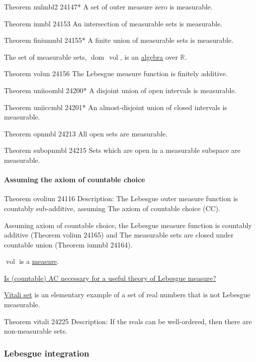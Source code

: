 \documentclass[12pt, letterpaper]{article}
\newcommand{\re}{\mathbb{R}}
\newcommand{\vol}{\operatorname{vol}}
\newcommand{\dom}{{\operatorname{dom}\,}}
\theoremstyle{definition}
\theoremstyle{remark}
\theoremstyle{definition}
\theoremstyle{plain}
\begin{document}
	Theorem	nulmbl2 24147*	A set of outer measure zero is measurable.
	
	Theorem	inmbl 24153	An intersection of measurable sets is measurable.
	
	Theorem	finiunmbl 24155*	A finite union of measurable sets is measurable.
	
	The set of measurable sets, $\dom\vol$, is an \href{https://en.wikipedia.org/wiki/Field_of_sets}{algebra} over $\re$.
	
	Theorem	volun 24156	The Lebesgue measure function is finitely additive.
	
	Theorem	uniioombl 24200*	A disjoint union of open intervals is measurable.
	
	Theorem	uniiccmbl 24201*	An almost-disjoint union of closed intervals is measurable.
	
	Theorem	opnmbl 24213	All open sets are measurable.
	
	Theorem	subopnmbl 24215	Sets which are open in a measurable subspace are measurable.
	
	\paragraph{Assuming the axiom of countable choice}
	
	Theorem ovoliun 24116
	Description: The Lebesgue outer measure function is countably sub-additive, assuming The axiom of countable choice (CC).
	
	Assuming axiom of countable choice, the Lebesgue measure function is countably additive (Theorem voliun 24165) and The measurable sets are closed under countable union (Theorem	iunmbl 24164).
	
	$\vol$ is a \href{https://en.wikipedia.org/wiki/Measure_(mathematics)#Definition}{measure}.
	
	\href{https://math.stackexchange.com/questions/719454/is-countable-ac-necessary-for-a-useful-theory-of-lebesgue-measure}{Is (countable) AC necessary for a useful theory of Lebesgue measure?}
	
	\href{https://en.wikipedia.org/wiki/Vitali_set}{Vitali set} is an elementary example of a set of real numbers that is not Lebesgue measurable.
	
	Theorem vitali 24225
	Description: If the reals can be well-ordered, then there are non-measurable sets.
	
	\subsubsection{Lebesgue integration}
\end{document}
